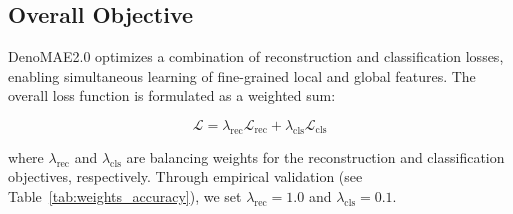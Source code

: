 






\subsection{Overall Objective}

DenoMAE2.0 optimizes a combination of reconstruction and classification losses, enabling simultaneous learning of fine-grained local and global features. The overall loss function is formulated as a weighted sum:

\begin{equation}
    \mathcal{L} = \lambda_{\text{rec}}\mathcal{L}_{\text{rec}} + \lambda_{\text{cls}}\mathcal{L}_{\text{cls}}
\end{equation}

where $\lambda_{\text{rec}}$ and $\lambda_{\text{cls}}$ are balancing weights for the reconstruction and classification objectives, respectively. Through empirical validation (see Table~\ref{tab:weights_accuracy}), we set $\lambda_{\text{rec}} = 1.0$ and $\lambda_{\text{cls}} = 0.1$.

